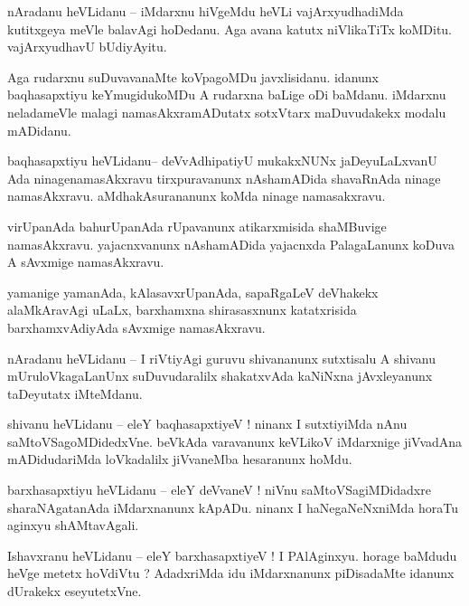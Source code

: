 \documentclass{article}
\begin{document}
\begin{mn}%
nAradanu heVLidanu -- iMdarxnu hiVgeMdu heVLi vajArxyudhadiMda kutitxgeya meVle balavAgi hoDedanu. 
Aga avana katutx niVlikaTiTx koMDitu. vajArxyudhavU bUdiyAyitu.
\end{mn}

\begin{mn}%
Aga rudarxnu suDuvavanaMte koVpagoMDu javxlisidanu. idanunx baqhasapxtiyu keYmugidukoMDu A rudarxna 
baLige oDi baMdanu. iMdarxnu neladameVle malagi namasAkxramADutatx sotxVtarx maDuvudakekx modalu 
mADidanu.
\end{mn}

\begin{mn}%
baqhasapxtiyu heVLidanu-- deVvAdhipatiyU mukakxNUNx jaDeyuLaLxvanU Ada ninagenamasAkxravu 
tirxpuravanunx nAshamADida shavaRnAda ninage namasAkxravu. aMdhakAsurananunx koMda ninage 
namasakxravu.
\end{mn}

\begin{mn}%
virUpanAda bahurUpanAda rUpavanunx atikarxmisida shaMBuvige namasAkxravu. yajacnxvanunx nAshamADida 
yajacnxda PalagaLanunx koDuva A sAvxmige namasAkxravu.
\end{mn}

\begin{mn}%
yamanige yamanAda, kAlasavxrUpanAda, sapaRgaLeV deVhakekx alaMkAravAgi uLaLx, barxhamxna 
shirasasxnunx katatxrisida barxhamxvAdiyAda sAvxmige namasAkxravu.
\end{mn}

\begin{mn}%
nAradanu heVLidanu -- I riVtiyAgi guruvu shivananunx sutxtisalu A shivanu mUruloVkagaLanUnx 
suDuvudaralilx shakatxvAda kaNiNxna jAvxleyanunx taDeyutatx iMteMdanu.
\end{mn}

\begin{mn}%
shivanu heVLidanu -- eleY baqhasapxtiyeV ! ninanx I sutxtiyiMda nAnu saMtoVSagoMDidedxVne. beVkAda 
varavanunx keVLikoV iMdarxnige jiVvadAna mADidudariMda loVkadalilx jiVvaneMba hesaranunx hoMdu.
\end{mn}

\begin{mn}%
barxhasapxtiyu heVLidanu -- eleY deVvaneV ! niVnu saMtoVSagiMDidadxre sharaNAgatanAda iMdarxnanunx 
kApADu. ninanx I haNegaNeNxniMda horaTu aginxyu shAMtavAgali.
\end{mn}

\begin{mn}%
Ishavxranu heVLidanu -- eleY barxhasapxtiyeV ! I PAlAginxyu. horage baMdudu heVge metetx hoVdiVtu ? 
AdadxriMda idu iMdarxnanunx piDisadaMte idanunx dUrakekx eseyutetxVne.
\end{mn}
\end{document}
